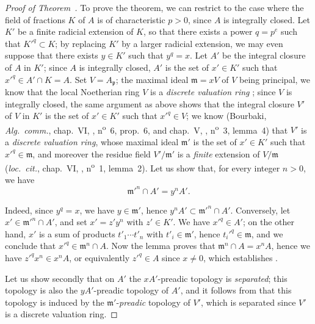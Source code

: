 \begin{proof}[Proof of Theorem~{\rm{}}]
To prove the theorem, we can restrict to the case where the field of fractions $K$ of $A$ is of characteristic $p>0$, since $A$ is integrally closed.
Let $K'$ be a finite radicial extension of $K$, so that there exists a power $q=p^e$ such that $K'^q\subset K$; by replacing $K'$ by a larger radicial extension, we may even suppose that there exists $y\in K'$ such that $y^q=x$.
Let $A'$ be the integral closure of $A$ in $K'$; since $A$ is integrally closed, $A'$ is the set of $x'\in K'$ such that $x'^q\in A'\cap K=A$.
Set $V=A_\mathfrak{p}$; the maximal ideal $\mathfrak{m}=xV$ of $V$ being principal, we know that the local Noetherian ring $V$ is a \emph{discrete valuation ring} ; since $V$ is integrally closed, the same
argument as above shows that the integral closure $V'$ of $V$ in $K'$ is the set of $x'\in K'$ such that $x'^q\in V$; we know (Bourbaki, \emph{Alg.~comm.}, chap.~VI, , n\textsuperscript{o}~6, prop.~6, and chap.~V, , n\textsuperscript{o}~3, lemma~4) that $V'$ is a \emph{discrete valuation ring}, whose maximal ideal $\mathfrak{m}'$ is the set of $x'\in K'$ such that $x'^q\in\mathfrak{m}$, and moreover the residue field $V'/\mathfrak{m}'$ is a \emph{finite} extension of $V/\mathfrak{m}$ (\emph{loc.~cit.}, chap.~VI, , n\textsuperscript{o}~1, lemma~2).
Let us show that, for every integer $n>0$, we have
\[
\label{0.23.1.3.2}
  \mathfrak{m}'^n\cap A'=y^nA'.
  \tag{23.1.3.2}
\]

Indeed, since $y^q=x$, we have $y\in\mathfrak{m}'$, hence $y^nA'\subset\mathfrak{m}'^n\cap A'$.
Conversely, let $x'\in\mathfrak{m}'^n\cap A'$, and set $x'=z'y^n$ with $z'\in K'$.
We have $x'^q\in A'$; on the other hand, $x'$ is a sum of products $t'_1\cdots t'_n$ with $t'_i\in\mathfrak{m}'$, hence $t_i'^q\in\mathfrak{m}$, and we conclude that $x'^q\in\mathfrak{m}^n\cap A$.
Now the lemma  proves that $\mathfrak{m}^n\cap A=x^nA$, hence we have $z'^qx^n\in x^nA$, or equivalently $z'^q\in A$ since $x\neq 0$, which establishes .

Let us show secondly that on $A'$ the $xA'$-preadic topology is \emph{separated}; this topology is also the $yA'$-preadic topology of $A'$, and it follows from  that this topology is induced by the $\mathfrak{m}'$-\emph{preadic} topology of $V'$, which is separated since $V'$ is a discrete valuation ring.


\end{proof}
